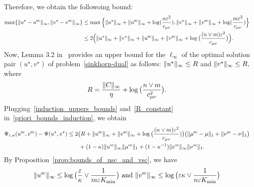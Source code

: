 Therefore, we obtain the followoing bound:
\begin{align}
\label{induction_uppers_bounds}
\max\{\norm{u^\star - u^{\text{sc}}}_\infty, \norm{v^\star - v^{\text{sc}}}_\infty\} %
&\leq \max\Big\{\norm{u^\star}_\infty + \norm{u^{\text{sc}}}_\infty +  \log(\frac{n\varepsilon^2}{c_{\mu\nu}}), \norm{v^\star}_\infty + \norm{v^{\text{sc}}}_\infty + \log(\frac{m\varepsilon^2}{c_{\mu\nu}})\Big\}\nonumber\\
&\leq 2\Big(\norm{u^\star}_\infty + \norm{v^\star}_\infty +  \norm{u^{\text{sc}}}_\infty +  \norm{v^{\text{sc}}}_\infty + \log\big(\frac{(n\vee m)\varepsilon^2}{c_{\mu\nu}}\big)\Big).
\end{align}
Now, Lemma 3.2 in~\cite{lin2019} provides an upper bound for the $\ell_\infty$ of the optimal solution pair $(u^\star, v^\star)$ of problem~\eqref{sinkhorn-dual} as follows:
$\|u^\star\|_\infty \leq R$ and $\|v^\star\|_\infty\leq R,$ where 
\begin{align}
\label{R_constant}
R = \frac{\|C\|_\infty}{\eta} + \log\big(\frac{n\vee m}{c^2_{\mu\nu}}\big).
\end{align}
Plugging~\eqref{induction_uppers_bounds} and~\eqref{R_constant} in~\eqref{priori_bounds_induction}, we obtain
\begin{align}
\Psi_{\varepsilon, \kappa}(u^{\text{sc}} ,v^{\text{sc}}) -\Psi(u^\star, v^\star) 
&\leq 2\big(R + \|u^{\text{sc}}\|_\infty +  \|v^{\text{sc}}\|_\infty + \log\big(\frac{(n\vee m)\varepsilon^2}{c_{\mu\nu}})\big) \big(\|\mu^{\text{sc}} - \mu\|_1+ \|\nu^{\text{sc}} - \nu\|_1\big)\nonumber\\
&\qquad + (1- \kappa)\|{u}^{\text{sc}}\|_\infty\|{\mu}^{\text{sc}}\|_1 + (1- \kappa^{-1})\|{v}^{\text{sc}}\|_\infty\|{\nu}^{\text{sc}}\|_1.\label{post_bounds_induction_2}
\end{align}
By Proposition~\ref{prop:bounds_of_usc_and_vsc}, we have 
\begin{align*} %
\norm{u^{\text{sc}}}_\infty \leq \log\big(\frac \varepsilon\kappa\vee \frac{1}{m\varepsilon K_{\min}}\big) \text{ and } \norm{v^{\text{sc}}}_\infty \leq \log\big(\varepsilon\kappa \vee \frac{1}{n\varepsilon K_{\min} }\big)
\end{align*}
